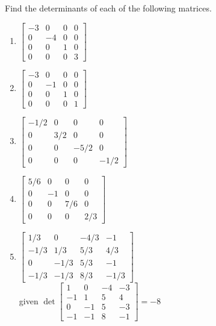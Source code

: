 \begin{exercise} \label{ex:default} 
Find the determinants of each of the following matrices.
\begin{enumerate}
\item \(\begin{bmatrix} -3&0&0&0
\\0&-4&0&0
\\0&0&1&0
\\0&0&0&3 \end{bmatrix}\)

\item \(\begin{bmatrix} -3&0&0&0
\\0&-1&0&0
\\0&0&1&0
\\0&0&0&1 \end{bmatrix}\)

\item \(\begin{bmatrix} -1/2&0&0&0
\\0&3/2&0&0
\\0&0&-5/2&0
\\0&0&0&-1/2 \end{bmatrix}\)

\item \(\begin{bmatrix} 5/6&0&0&0
\\0&-1&0&0
\\0&0&7/6&0
\\0&0&0&2/3 \end{bmatrix}\)


\item \(\begin{bmatrix} 1/3&0&-4/3&-1
\\-1/3&1/3&5/3&4/3
\\0&-1/3&5/3&-1
\\-1/3&-1/3&8/3&-1/3 \end{bmatrix}\)
\\given \(\det\begin{bmatrix} 1&0&-4&-3
\\-1&1&5&4
\\0&-1&5&-3
\\-1&-1&8&-1 \end{bmatrix}= -8 \)


\end{enumerate}
\end{exercise}
